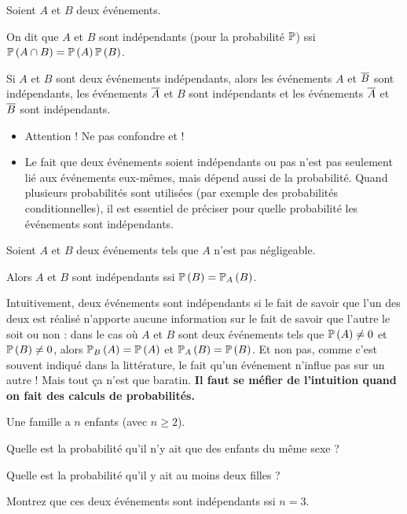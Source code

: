\begin{defi}
Soient \(A\) et \(B\) deux événements.

On dit que \(A\) et \(B\) sont indépendants (pour la probabilité \(\prem\)) ssi \(\proba{A\inter B}=\proba{A}\proba{B}\).
\end{defi}

\begin{prop}
Si \(A\) et \(B\) sont deux événements indépendants, alors les événements \(A\) et \(\conj{B}\) sont indépendants, les événements \(\conj{A}\) et \(B\) sont indépendants et les événements \(\conj{A}\) et \(\conj{B}\) sont indépendants.
\end{prop}

\begin{rem}
\begin{itemize}
    \item Attention ! Ne pas confondre  et  ! \\
    \item Le fait que deux événements soient indépendants ou pas n'est pas seulement lié aux événements eux-mêmes, mais dépend aussi de la probabilité. Quand plusieurs probabilités sont utilisées (par exemple des probabilités conditionnelles), il est essentiel de préciser pour quelle probabilité les événements sont indépendants.
\end{itemize}
\end{rem}

\begin{prop}
Soient \(A\) et \(B\) deux événements tels que \(A\) n'est pas négligeable.

Alors \(A\) et \(B\) sont indépendants ssi \(\proba{B}=\probacond{B}{A}\).
\end{prop}

Intuitivement, deux événements sont indépendants si le fait de savoir que l'un des deux est réalisé n'apporte aucune information sur le fait de savoir que l'autre le soit ou non : dans le cas où \(A\) et \(B\) sont deux événements tels que \(\proba{A}\not=0\) et \(\proba{B}\not=0\), alors \(\probacond{A}{B}=\proba{A}\) et \(\probacond{B}{A}=\proba{B}\). Et non pas, comme c'est souvent indiqué dans la littérature, le fait qu'un événement n'influe pas sur un autre ! Mais tout ça n'est que baratin. \textbf{Il faut se méfier de l'intuition quand on fait des calculs de probabilités.}

\begin{exo}
Une famille a \(n\) enfants (avec \(n\geq2\)).

Quelle est la probabilité qu'il n'y ait que des enfants du même sexe ?

Quelle est la probabilité qu'il y ait au moins deux filles ?

Montrez que ces deux événements sont indépendants ssi \(n=3\).
\end{exo}


